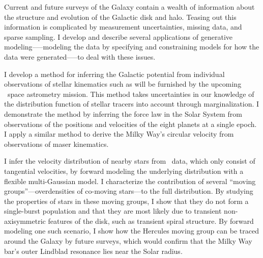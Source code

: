 Current and future surveys of the Galaxy contain a wealth of
information about the structure and evolution of the Galactic disk and
halo. Teasing out this information is complicated by measurement
uncertainties, missing data, and sparse sampling. I develop and
describe several applications of generative modeling--—modeling the
data by specifying and constraining models for how the data were
generated--—to deal with these issues. 

I develop a method for inferring the Galactic potential from
individual observations of stellar kinematics such as will be
furnished by the upcoming \Gaia\ space astrometry mission. This method
takes uncertainties in our knowledge of the distribution function of
stellar tracers into account through marginalization. I demonstrate
the method by inferring the force law in the Solar System from
observations of the positions and velocities of the eight planets at a
single epoch. I apply a similar method to derive the Milky Way's
circular velocity from observations of maser kinematics.

I infer the velocity distribution of nearby stars from
\hipparcos\ data, which only consist of tangential velocities, by
forward modeling the underlying distribution with a flexible
multi-Gaussian model. I characterize the contribution of several
``moving groups''---overdensities of co-moving stars---to the full
distribution. By studying the properties of stars in these moving
groups, I show that they do not form a single-burst population and
that they are most likely due to transient non-axisymmetric features
of the disk, such as transient spiral structure. By forward modeling
one such scenario, I show how the Hercules moving group can be traced
around the Galaxy by future surveys, which would confirm that the
Milky Way bar's outer Lindblad resonance lies near the Solar radius.
